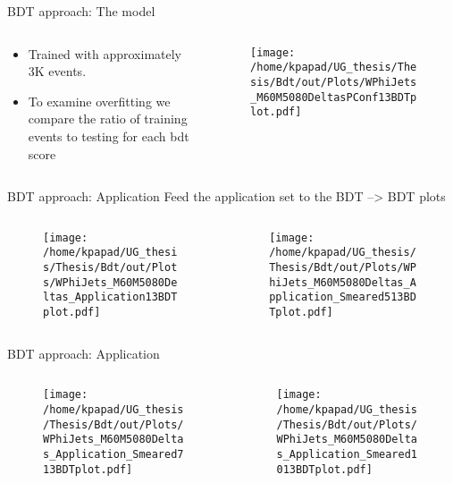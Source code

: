 \documentclass[bigger]{beamer}
\begin{document}
\begin{frame}[label={sec:orgf637bac}]{BDT approach: The model}
\begin{columns}
\begin{column}{0.5\columnwidth}
\begin{itemize}
\item Trained with approximately 3K events.
\item To examine overfitting we compare the ratio of training events to testing for each bdt score
\end{itemize}
\end{column}
\begin{column}{0.5\columnwidth}
  \begin{figure}[h!]
\centering
\texttt{[image: /home/kpapad/UG\_thesis/Thesis/Bdt/out/Plots/WPhiJets\_M60M5080DeltasPConf13BDTplot.pdf]}
\end{figure}
\end{column}
\end{columns}
\end{frame}

\begin{frame}[label={sec:orgb0d2a7d}]{BDT approach: Application}
Feed the application set to the BDT --> BDT plots
\begin{columns}
\begin{column}{0.5\columnwidth}
\begin{figure}[h]
\centering
\texttt{[image: /home/kpapad/UG\_thesis/Thesis/Bdt/out/Plots/WPhiJets\_M60M5080Deltas\_Application13BDTplot.pdf]}
\end{figure}
\end{column}
\begin{column}{0.5\columnwidth}
\begin{figure}[h]
\centering
\texttt{[image: /home/kpapad/UG\_thesis/Thesis/Bdt/out/Plots/WPhiJets\_M60M5080Deltas\_Application\_Smeared513BDTplot.pdf]}
\end{figure}
\end{column}
\end{columns}
\end{frame}

\begin{frame}[label={sec:orgdf56697}]{BDT approach: Application}
\begin{columns}
\begin{column}{0.5\columnwidth}
\begin{figure}[h]
\centering
\texttt{[image: /home/kpapad/UG\_thesis/Thesis/Bdt/out/Plots/WPhiJets\_M60M5080Deltas\_Application\_Smeared713BDTplot.pdf]}
\end{figure}
\end{column}
\begin{column}{0.5\columnwidth}
\begin{figure}[h]
\centering
\texttt{[image: /home/kpapad/UG\_thesis/Thesis/Bdt/out/Plots/WPhiJets\_M60M5080Deltas\_Application\_Smeared1013BDTplot.pdf]}
\end{figure}
\end{column}
\end{columns}
\end{frame}
\end{document}
